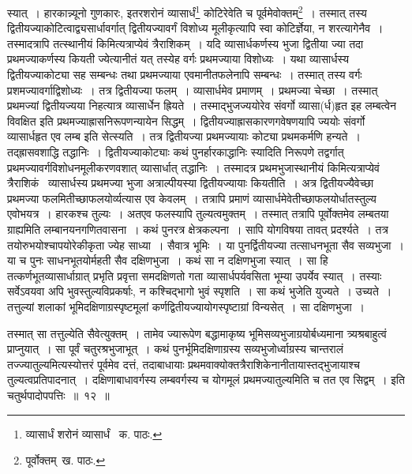 \documentclass[11pt, openany]{book}
\begin{document}
\noindent स्यात्~। हारकान्न्यूनो गुणकारः, इतरशरोनं व्यासार्धं\renewcommand{\thefootnote}{१}\footnote{व्यासार्धं शरोनं व्यासार्धं \textendash\ क. पाठः.} कोटिरेवेति च पूर्वमेवोक्तम्\renewcommand{\thefootnote}{२}\footnote{पूर्वोक्तम्\textendash\ ख. पाठः.}~। तस्मात् तस्य द्वितीयज्याकोटित्वाद्व्यसार्धावर्गात् द्वितीयज्यावर्गं विशोध्य मूलीकृत्यापि स्वा कोटिर्ज्ञेया, न शरत्यागेनैव~। तस्मादत्रापि तत्स्थानीयं किमित्यत्राप्येवं त्रैराशिकम्~। यदि व्यासार्धकर्णस्य भुजा द्वितीया ज्या तदा प्रथमज्याकर्णस्य कियती ज्येत्यानीतं यत् तस्येह वर्गः प्रथमज्याया विशोध्यः~। यथा व्यासार्धस्य द्वितीयज्याकोट्या सह सम्बन्धः तथा प्रथमज्याया एवमानीतफलेनापि सम्बन्धः~। तस्मात् तस्य वर्गः प्रशमज्यावर्गाद्विशोध्यः~। तत्र द्वितीयज्या फलम्~। व्यासार्धमेव प्रमाणम्~। प्रथमज्या चेच्छा~। तस्मात् प्रथमज्यां द्वितीयज्यया निहत्यात्र व्यासार्धेन ह्रियते~। तस्माद्भुजज्ययोरेव संवर्गो व्यासा(र्ध)हृत इह लम्बत्वेन विवक्षित इति प्रथमज्याह्रासनिरूपणन्यायेन सिद्धम्~। द्वितीयज्याह्रासकारणगवेषणयापि ज्ययोः संवर्गो व्यासार्धहृत एव लम्ब इति सेत्स्यति~। तत्र द्वितीयज्या प्रथमज्यायाः कोट्या प्रथमकर्मणि हन्यते~। तद्ह्रासवशाद्धि तद्धानिः~। द्वितीयज्याकोट्याः कथं पुनर्हारकाद्धानिः स्यादिति निरूपणे तद्वर्गात् प्रथमज्यावर्गविशोधनमूलीकरणवशात् व्यासार्धात् तद्धानिः~। तस्मादत्र प्रथमभुजास्थानीयं किमित्यत्राप्येवं त्रैराशिकं \textendash\ व्यासार्धस्य
प्रथमज्या भुजा अत्राल्पीयस्या द्वितीयज्यायाः कियतीति~। अत्र द्वितीयज्यैवेच्छा प्रथमज्या फलमितीच्छाफलयोर्व्यत्यास एव केवलम्~। तत्रापि प्रमाणं व्यासार्धमेवेतीच्छाफलयोर्धातस्तुल्य एवोभयत्र~। हारकश्च तुल्यः~। अतएव फलस्यापि तुल्यत्वमुक्तम्~। तस्मात् तत्रापि पूर्वोक्तमेव लम्बतया ग्राह्यमिति लम्बानयनगणितवासना~। कथं पुनरत्र क्षेत्रकल्पना~। सापि योगविषया तावत् प्रदर्श्यते~। तत्र तयोरुभयोश्चापयोरेकीकृता ज्येह साध्या~। सैवात्र भूमिः~। या पुनर्द्वितीयज्या तत्साधनभूता सैव सव्यभुजा~। या च पुनः साधनभूतयोर्महती सैव दक्षिणभुजा~। कथं सा न दक्षिणभुजा स्यात्~। सा हि तत्कर्णभूतव्यासार्धाग्रात् प्रभृति प्रवृत्ता समदक्षिणतो गता व्यासार्धपर्यवसिता भूम्या उपर्येव स्यात्~। तस्याः सर्वेऽवयवा अपि भुवस्तुल्यविप्रकर्षाः, न कश्चिद्भागो भुवं स्पृशति~। सा कथं भुजेति युज्यते~। उच्यते~। तत्तुल्यां शलाकां भूमिदक्षिणाग्रस्पृष्टमूलां कर्णद्वितीयज्यायोगस्पृष्टाग्रां विन्यसेत्~। सा दक्षिणभुजा~।

\newpage

\noindent तस्मात् सा तत्तुल्येति सैवेत्युक्तम्~। तामेव ज्यारूपेण बद्धामाकृष्य भूमिसव्यभुजाग्रयोर्बध्यमाना त्र्यश्रबाहुत्वं प्राप्नुयात्~। सा पूर्वं
चतुरश्रभुजाभूत्~। कथं पुनर्भूमिदक्षिणाग्रस्य सव्यभुजोर्ध्वाग्रस्य चान्तरालं तज्ज्यातुल्यमित्यस्योत्तरं पूर्वमेव दत्तं, तदाबाधायाः
प्रथमवाक्योक्तत्रैराशिकेनानीतायास्तद्भुजायाश्च तुल्यत्वप्रतिपादनात्~। दक्षिणाबाधावर्गस्य लम्बवर्गस्य च योगमूलं प्रथमज्यातुल्यमिति च तत एव सिद्वम्~। इति चतुर्थपादोपपत्तिः~॥~१२~॥\\
\end{document}
